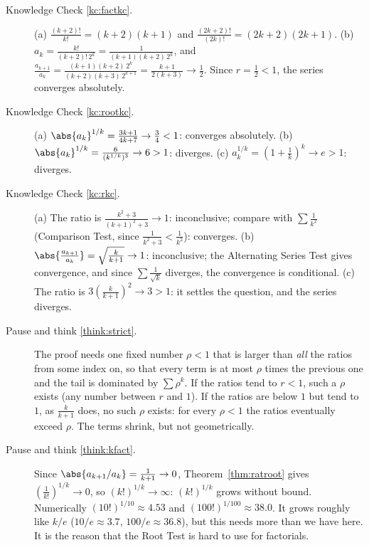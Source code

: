\documentclass[11pt]{article}
\begin{document}
\begin{description}
  \item[Knowledge Check \ref{kc:factkc}.] (a) $\frac{(k+2)!}{k!}=(k+2)(k+1)$ and $\frac{(2k+2)!}{(2k)!}=(2k+2)(2k+1)$. (b) $a_k=\frac{k!}{(k+2)!\,2^k}=\frac1{(k+1)(k+2)\,2^k}$, and $\frac{a_{k+1}}{a_k}=\frac{(k+1)(k+2)\,2^k}{(k+2)(k+3)\,2^{k+1}}=\frac{k+1}{2(k+3)}\to\frac12$. Since $r=\frac12<1$, the series converges absolutely.
  \item[Knowledge Check \ref{kc:rootkc}.] (a) $\abs{a_k}^{1/k}=\frac{3k+1}{4k+7}\to\frac34<1$: converges absolutely. (b) $\abs{a_k}^{1/k}=\frac6{(k^{1/k})^3}\to6>1$: diverges. (c) $a_k^{1/k}=\left(1+\frac1k\right)^k\to e>1$: diverges.
  \item[Knowledge Check \ref{kc:rkc}.] (a) The ratio is $\frac{k^2+3}{(k+1)^2+3}\to1$: inconclusive; compare with $\sum\frac1{k^2}$ (Comparison Test, since $\frac1{k^2+3}<\frac1{k^2}$): converges. (b) $\abs{\frac{a_{k+1}}{a_k}}=\sqrt{\frac k{k+1}}\to1$: inconclusive; the Alternating Series Test gives convergence, and since $\sum\frac1{\sqrt k}$ diverges, the convergence is conditional. (c) The ratio is $3\left(\frac k{k+1}\right)^2\to3>1$: it settles the question, and the series diverges.
  \item[Pause and think \ref{think:strict}.] The proof needs one fixed number $\rho<1$ that is larger than \emph{all} the ratios from some index on, so that every term is at most $\rho$ times the previous one and the tail is dominated by $\sum\rho^k$. If the ratios tend to $r<1$, such a $\rho$ exists (any number between $r$ and $1$). If the ratios are below $1$ but tend to $1$, as $\frac k{k+1}$ does, no such $\rho$ exists: for every $\rho<1$ the ratios eventually exceed $\rho$. The terms shrink, but not geometrically.
  \item[Pause and think \ref{think:kfact}.] Since $\abs{a_{k+1}/a_k}=\frac1{k+1}\to0$, Theorem~\ref{thm:ratroot} gives $\left(\frac1{k!}\right)^{1/k}\to0$, so $(k!)^{1/k}\to\infty$: $(k!)^{1/k}$ grows without bound. Numerically $(10!)^{1/10}\approx4.53$ and $(100!)^{1/100}\approx38.0$. It grows roughly like $k/e$ ($10/e\approx3.7$, $100/e\approx36.8$), but this needs more than we have here. It is the reason that the Root Test is hard to use for factorials.

\end{description}
\end{document}
